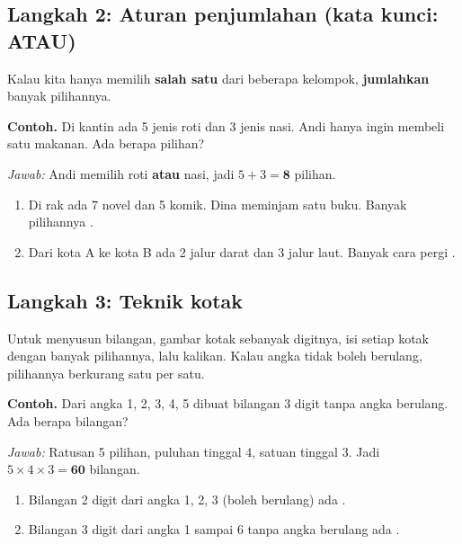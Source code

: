 \documentclass[11pt,a4paper]{article}
\begin{document}
\subsection*{Langkah 2: Aturan penjumlahan (kata kunci: ATAU)}
Kalau kita hanya memilih \textbf{salah satu} dari beberapa kelompok, \textbf{jumlahkan} banyak
pilihannya.

\begin{contoh}
\textbf{Contoh.} Di kantin ada 5 jenis roti dan 3 jenis nasi. Andi hanya ingin membeli satu
makanan. Ada berapa pilihan?

\textit{Jawab:} Andi memilih roti \textbf{atau} nasi, jadi $5 + 3 = \textbf{8}$ pilihan.
\end{contoh}

\begin{giliranmu}
\begin{enumerate}[label=\alph*.]
    \item Di rak ada 7 novel dan 5 komik. Dina meminjam satu buku. Banyak pilihannya \kosong.
    \item Dari kota A ke kota B ada 2 jalur darat dan 3 jalur laut. Banyak cara pergi \kosong.
\end{enumerate}
\end{giliranmu}

\subsection*{Langkah 3: Teknik kotak}
Untuk menyusun bilangan, gambar kotak sebanyak digitnya, isi setiap kotak dengan banyak
pilihannya, lalu kalikan. Kalau angka tidak boleh berulang, pilihannya berkurang satu per satu.

\begin{contoh}
\textbf{Contoh.} Dari angka 1, 2, 3, 4, 5 dibuat bilangan 3 digit tanpa angka berulang.
Ada berapa bilangan?

\textit{Jawab:} Ratusan 5 pilihan, puluhan tinggal 4, satuan tinggal 3.
Jadi $5 \times 4 \times 3 = \textbf{60}$ bilangan.
\end{contoh}

\begin{giliranmu}
\begin{enumerate}[label=\alph*.]
    \item Bilangan 2 digit dari angka 1, 2, 3 (boleh berulang) ada \kosong.
    \item Bilangan 3 digit dari angka 1 sampai 6 tanpa angka berulang ada \kosong.
\end{enumerate}
\end{giliranmu}
\end{document}
